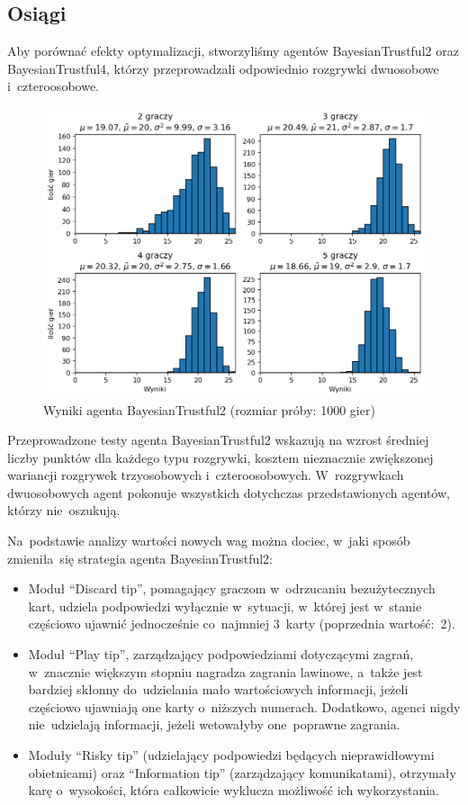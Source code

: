 \documentclass[declaration,shortabstract,inz]{iithesis}
\begin{document}
\subsection*{Osiągi}

Aby porównać efekty optymalizacji, stworzyliśmy agentów BayesianTrustful2 oraz BayesianTrustful4, którzy przeprowadzali odpowiednio rozgrywki dwuosobowe i~czteroosobowe.

\begin{figure}[H]
	\centering
	\captionsetup{format=hang}
	\includegraphics[width=.92\textwidth,height=\textheight,keepaspectratio]{BayesianTrustful2.png}
	\caption[Caption]{Wyniki agenta BayesianTrustful2 (rozmiar próby: 1000 gier)}
	\label{fig:BayesianTrustful2}
\end{figure}


Przeprowadzone testy agenta BayesianTrustful2 wskazują na wzrost średniej liczby punktów dla każdego typu rozgrywki, kosztem nieznacznie zwiększonej wariancji rozgrywek trzyosobowych i~czteroosobowych. W~rozgrywkach dwuosobowych agent pokonuje wszystkich dotychczas przedstawionych agentów, którzy nie~oszukują.

Na~podstawie analizy wartości nowych wag można dociec, w~jaki sposób zmieniła~się strategia agenta BayesianTrustful2:

\begin{itemize}
	\item Moduł ``Discard tip'', pomagający graczom w~odrzucaniu bezużytecznych kart, udziela podpowiedzi wyłącznie w~sytuacji, w~której jest w~stanie częściowo ujawnić jednocześnie co~najmniej 3~karty (poprzednia wartość:~2).
	\item Moduł ``Play tip'', zarządzający podpowiedziami dotyczącymi zagrań, w~znacznie większym stopniu nagradza zagrania lawinowe, a~także jest bardziej skłonny do~udzielania mało wartościowych informacji, jeżeli częściowo ujawniają one karty o~niższych numerach. Dodatkowo, agenci nigdy nie~udzielają informacji, jeżeli wetowałyby one~poprawne zagrania.
	\item Moduły ``Risky tip'' (udzielający podpowiedzi będących nieprawidłowymi obietnicami) oraz ``Information tip'' (zarządzający komunikatami), otrzymały karę o~wysokości, która całkowicie wyklucza możliwość ich wykorzystania.
\end{itemize}
\end{document}
